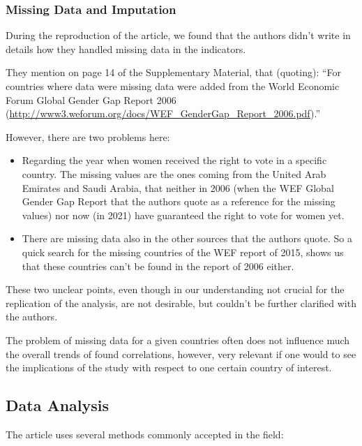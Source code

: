 \documentclass[
  11pt,
]{article}
\begin{document}
\hypertarget{missing-data-and-imputation}{%
\subsubsection{Missing Data and
Imputation}\label{missing-data-and-imputation}}

During the reproduction of the article, we found that the authors didn't
write in details how they handled missing data in the indicators.

They mention on page 14 of the Supplementary Material, that (quoting):
``For countries where data were missing data were added from the World
Economic Forum Global Gender Gap Report 2006
(\url{http://www3.weforum.org/docs/WEF_GenderGap_Report_2006.pdf}).''

However, there are two problems here:

\begin{itemize}
\item
  Regarding the year when women received the right to vote in a specific
  country. The missing values are the ones coming from the United Arab
  Emirates and Saudi Arabia, that neither in 2006 (when the WEF Global
  Gender Gap Report that the authors quote as a reference for the
  missing values) nor now (in 2021) have guaranteed the right to vote
  for women yet.
\item
  There are missing data also in the other sources that the authors
  quote. So a quick search for the missing countries of the WEF report
  of 2015, shows us that these countries can't be found in the report of
  2006 either.
\end{itemize}

These two unclear points, even though in our understanding not crucial
for the replication of the analysis, are not desirable, but couldn't be
further clarified with the authors.

The problem of missing data for a given countries often does not
influence much the overall trends of found correlations, however, very
relevant if one would to see the implications of the study with respect
to one certain country of interest.

\hypertarget{data-analysis}{%
\subsection{Data Analysis}\label{data-analysis}}

The article uses several methods commonly accepted in the field:
\end{document}
